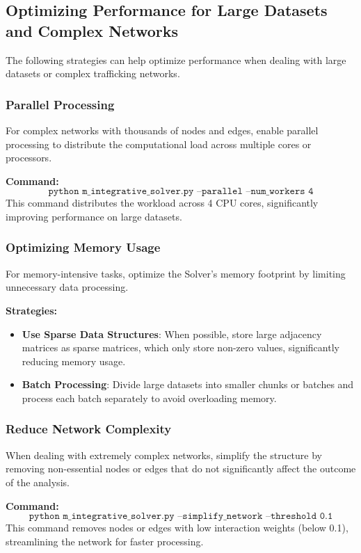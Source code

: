 \documentclass[%
 preprint, linenumbers,
 amsmath,amssymb,
 aps, physrev,
]{revtex4-2}
\begin{document}
\subsection{Optimizing Performance for Large Datasets and Complex Networks}

The following strategies can help optimize performance when dealing with large datasets or complex trafficking networks.

\subsubsection{Parallel Processing}

For complex networks with thousands of nodes and edges, enable parallel processing to distribute the computational load across multiple cores or processors.

\textbf{Command:}
\[
\texttt{python m\_integrative\_solver.py --parallel --num\_workers 4}
\]
This command distributes the workload across 4 CPU cores, significantly improving performance on large datasets.

\subsubsection{Optimizing Memory Usage}

For memory-intensive tasks, optimize the Solver’s memory footprint by limiting unnecessary data processing.

\textbf{Strategies:}
\begin{itemize}
    \item \textbf{Use Sparse Data Structures}: When possible, store large adjacency matrices as sparse matrices, which only store non-zero values, significantly reducing memory usage.
    \item \textbf{Batch Processing}: Divide large datasets into smaller chunks or batches and process each batch separately to avoid overloading memory.
\end{itemize}

\subsubsection{Reduce Network Complexity}

When dealing with extremely complex networks, simplify the structure by removing non-essential nodes or edges that do not significantly affect the outcome of the analysis.

\textbf{Command:}
\[
\texttt{python m\_integrative\_solver.py --simplify\_network --threshold 0.1}
\]
This command removes nodes or edges with low interaction weights (below 0.1), streamlining the network for faster processing.
\end{document}
